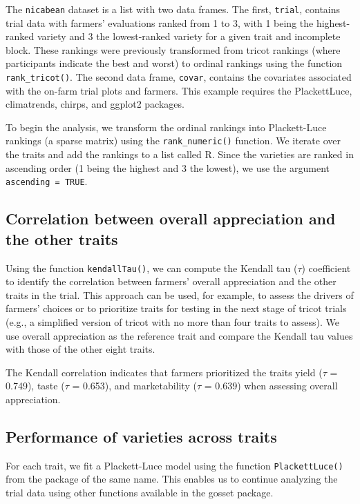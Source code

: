 \documentclass[
]{book}
\begin{document}
The \texttt{nicabean} dataset is a list with two data frames. The first, \texttt{trial}, contains trial data with farmers' evaluations ranked from 1 to 3, with 1 being the highest-ranked variety and 3 the lowest-ranked variety for a given trait and incomplete block. These rankings were previously transformed from tricot rankings (where participants indicate the best and worst) to ordinal rankings using the function \texttt{rank\_tricot()}. The second data frame, \texttt{covar}, contains the covariates associated with the on-farm trial plots and farmers. This example requires the PlackettLuce, climatrends, chirps, and ggplot2 packages.

To begin the analysis, we transform the ordinal rankings into Plackett-Luce rankings (a sparse matrix) using the \texttt{rank\_numeric()} function. We iterate over the traits and add the rankings to a list called R. Since the varieties are ranked in ascending order (1 being the highest and 3 the lowest), we use the argument \texttt{ascending\ =\ TRUE}.

\subsection{Correlation between overall appreciation and the other traits}\label{correlation-between-overall-appreciation-and-the-other-traits}

Using the function \texttt{kendallTau()}, we can compute the Kendall tau (\(\tau\)) coefficient \citep{kendall_1938} to identify the correlation between farmers' overall appreciation and the other traits in the trial. This approach can be used, for example, to assess the drivers of farmers' choices or to prioritize traits for testing in the next stage of tricot trials (e.g., a simplified version of tricot with no more than four traits to assess). We use overall appreciation as the reference trait and compare the Kendall tau values with those of the other eight traits.

The Kendall correlation indicates that farmers prioritized the traits yield (\(\tau\) = 0.749), taste (\(\tau\) = 0.653), and marketability (\(\tau\) = 0.639) when assessing overall appreciation.

\subsection{Performance of varieties across traits}\label{performance-of-varieties-across-traits}

For each trait, we fit a Plackett-Luce model using the function \texttt{PlackettLuce()} from the package of the same name. This enables us to continue analyzing the trial data using other functions available in the gosset package.
\end{document}
